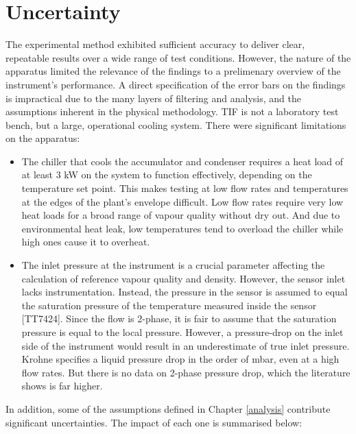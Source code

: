 \documentclass{report}
\begin{document}
\section{Uncertainty}
The experimental method exhibited sufficient accuracy to deliver clear, repeatable results over a wide range of test conditions. However, the nature of the apparatus limited the relevance of the findings to a prelimenary overview of the instrument's performance. A direct specification of the error bars on the findings is impractical due to the many layers of filtering and analysis, and the assumptions inherent in the physical methodology. TIF is not a laboratory test bench, but a large, operational cooling system. There were significant limitations on the apparatus:
\begin{itemize}
\item{The chiller that cools the accumulator and condenser requires a heat load of at least 3 kW on the system to function effectively, depending on the temperature set point. This makes testing at low flow rates and temperatures at the edges of the plant's envelope difficult. Low flow rates require very low heat loads for a broad range of vapour quality without dry out. And due to environmental heat leak, low temperatures tend to overload the chiller while high ones cause it to overheat.}
\item{The inlet pressure at the instrument is a crucial parameter affecting the calculation of reference vapour quality and density. However, the sensor inlet lacks instrumentation. Instead, the pressure in the sensor is assumed to equal the saturation pressure of the temperature measured inside the sensor [TT7424]. Since the flow is 2-phase, it is fair to assume that the saturation pressure is equal to the local pressure. However, a pressure-drop on the inlet side of the instrument would result in an underestimate of true inlet pressure. Krohne specifies a liquid pressure drop in the order of mbar, even at a high flow rates. But there is no data on 2-phase pressure drop, which the literature shows is far higher.\cite{Mastrullo 2010}}
\end{itemize}
In addition, some of the assumptions defined in Chapter \ref{analysis} contribute significant uncertainties. The impact of each one is summarised below:
\end{document}
